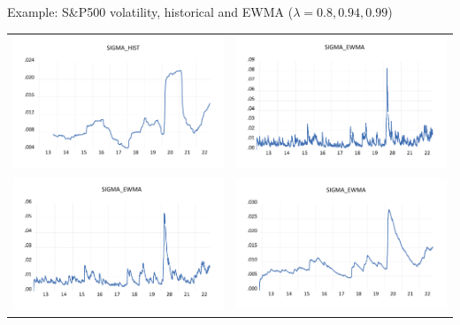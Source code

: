 \begin{frame}%

\begin{block}{Example: S\&P500 volatility, historical and EWMA ($\lambda = 0.8,0.94,0.99$)}
\begin{tabular}{cc}
\includegraphics[width=.4\textwidth]{historical}&
\includegraphics[width=.4\textwidth]{EWMA08}\\
\includegraphics[width=.4\textwidth]{EWMA94}&
\includegraphics[width=.4\textwidth]{EWMA99}
\end{tabular}
\end{block}

\end{frame}%
